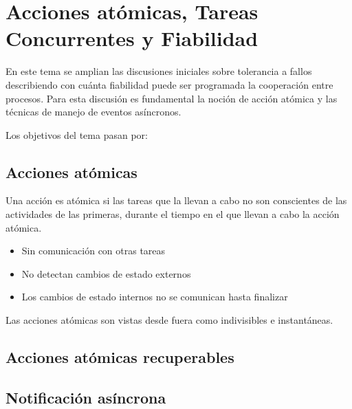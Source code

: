 \section{Acciones atómicas, Tareas Concurrentes y Fiabilidad}

En este tema se amplian las discusiones iniciales sobre tolerancia a fallos
describiendo con cuánta fiabilidad puede ser programada la cooperación entre
procesos. Para esta discusión es fundamental la noción de acción atómica y las
técnicas de manejo de eventos asíncronos.

Los objetivos del tema pasan por:

\subsection{Acciones atómicas}

Una acción es atómica si las tareas que la llevan a cabo no son conscientes de
las actividades de las primeras, durante el tiempo en el que llevan a cabo la
acción atómica.

\begin{itemize}
	\item Sin comunicación con otras tareas
	\item No detectan cambios de estado externos
	\item Los cambios de estado internos no se comunican hasta finalizar
\end{itemize}

Las acciones atómicas son vistas desde fuera como indivisibles e instantáneas.

\subsection{Acciones atómicas recuperables}

\subsection{Notificación asíncrona}
